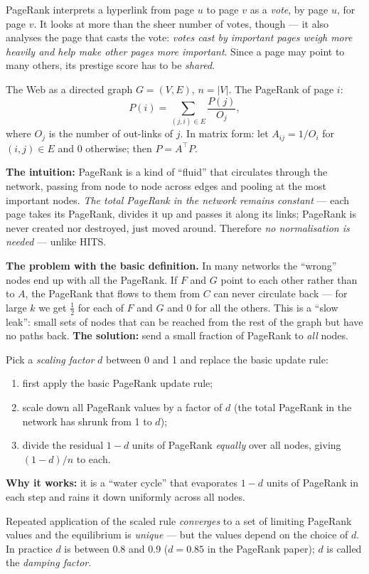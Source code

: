 \documentclass[11pt,a4paper]{article}
\theoremstyle{definition}
\providecommand{\uv}[1]{``#1''}
\begin{document}
\begin{defbox}
PageRank interprets a hyperlink from page $u$ to page $v$ as a \emph{vote}, by page $u$, for page $v$.
It looks at more than the sheer number of votes, though --- it also analyses the page that casts the
vote: \emph{votes cast by important pages weigh more heavily and help make other pages more
important}. Since a page may point to many others, its prestige score has to be \emph{shared}.

The Web as a directed graph $G=(V,E)$, $n=|V|$. The PageRank of page $i$:
\[ P(i)=\sum_{(j,i)\in E}\frac{P(j)}{O_j}, \]
where $O_j$ is the number of out-links of $j$. In matrix form: let $A_{ij}=1/O_i$ for $(i,j)\in E$ and
0 otherwise; then $P=A^{\!\top}P$.

\textbf{The intuition:} PageRank is a kind of \uv{fluid} that circulates through the network, passing
from node to node across edges and pooling at the most important nodes. \emph{The total PageRank in
the network remains constant} --- each page takes its PageRank, divides it up and passes it along its
links; PageRank is never created nor destroyed, just moved around. Therefore \emph{no normalisation is
needed} --- unlike HITS.
\end{defbox}

\textbf{The problem with the basic definition.} In many networks the \uv{wrong} nodes end up with all
the PageRank. If $F$ and $G$ point to each other rather than to $A$, the PageRank that flows to them
from $C$ can never circulate back --- for large $k$ we get $\frac12$ for each of $F$ and $G$ and 0 for
all the others. This is a \uv{slow leak}: small sets of nodes that can be reached from the rest of the
graph but have no paths back. \textbf{The solution:} send a small fraction of PageRank to \emph{all}
nodes.

\begin{defbox}
Pick a \emph{scaling factor} $d$ between 0 and 1 and replace the basic update rule:
\begin{enumerate}
\item first apply the basic PageRank update rule;
\item scale down all PageRank values by a factor of $d$ (the total PageRank in the network has shrunk
      from 1 to $d$);
\item divide the residual $1-d$ units of PageRank \emph{equally} over all nodes, giving $(1-d)/n$ to
      each.
\end{enumerate}
\textbf{Why it works:} it is a \uv{water cycle} that evaporates $1-d$ units of PageRank in each step
and rains it down uniformly across all nodes.

Repeated application of the scaled rule \emph{converges} to a set of limiting PageRank values and the
equilibrium is \emph{unique} --- but the values depend on the choice of $d$. In practice $d$ is
between 0.8 and 0.9 ($d=0.85$ in the PageRank paper); $d$ is called the \emph{damping factor}.
\end{defbox}
\end{document}
